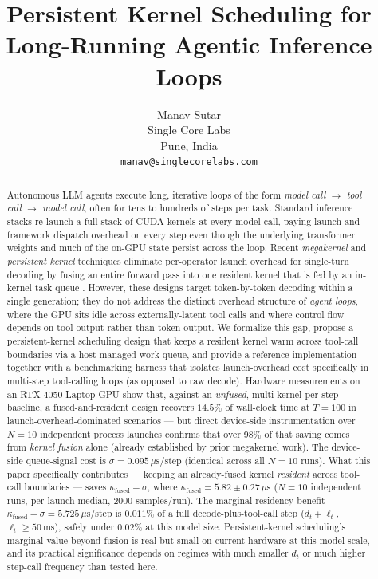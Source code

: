 \documentclass{article}
\title{Persistent Kernel Scheduling for Long-Running Agentic Inference Loops}
\author{
  Manav Sutar \\
  Single Core Labs \\
  Pune, India \\
  \texttt{manav@singlecorelabs.com}
}
\begin{document}
\maketitle

\begin{abstract}
Autonomous LLM agents execute long, iterative loops of the form
\emph{model call} $\rightarrow$ \emph{tool call} $\rightarrow$ \emph{model call},
often for tens to hundreds of steps per task. Standard inference stacks
re-launch a full stack of CUDA kernels at every model call, paying
launch and framework dispatch overhead on every step even though the
underlying transformer weights and much of the on-GPU state persist
across the loop. Recent \emph{megakernel} and \emph{persistent kernel}
techniques eliminate per-operator launch overhead for single-turn
decoding by fusing an entire forward pass into one resident kernel
that is fed by an in-kernel task queue \citep{mpk2025,kog2026,adamk2026}.
However, these designs target token-by-token decoding within a single
generation; they do not address the distinct overhead structure of
\emph{agent loops}, where the GPU sits idle across externally-latent
tool calls and where control flow depends on tool output rather than
token output. We formalize this gap, propose a persistent-kernel
scheduling design that keeps a resident kernel warm across tool-call
boundaries via a host-managed work queue, and provide a reference
implementation together with a benchmarking harness that isolates
launch-overhead cost specifically in multi-step tool-calling loops
(as opposed to raw decode). Hardware measurements on an RTX 4050
Laptop GPU show that, against an \emph{unfused}, multi-kernel-per-step
baseline, a fused-and-resident design recovers $14.5\%$ of
wall-clock time at $T=100$ in launch-overhead-dominated scenarios ---
but direct device-side instrumentation over $N=10$ independent
process launches confirms that over $98\%$ of that saving comes from
\emph{kernel fusion} alone (already established by prior megakernel
work). The device-side queue-signal cost is
$\sigma = 0.095\,\mu\text{s}$/step (identical across all $N=10$
runs). What this paper specifically contributes --- keeping an
already-fused kernel \emph{resident} across tool-call boundaries ---
saves $\kappa_{\text{fused}} - \sigma$, where
$\kappa_{\text{fused}} = 5.82 \pm 0.27\,\mu\text{s}$
($N=10$ independent runs, per-launch median, $2000$ samples/run).
The marginal residency benefit $\kappa_{\text{fused}} - \sigma =
5.725\,\mu\text{s}$/step is $0.011\%$ of a full decode-plus-tool-call
step ($d_t + \ell_t$, $\ell_t \geq 50$\,ms), safely under
$0.02\%$ at this model size. Persistent-kernel scheduling's marginal value beyond fusion is
real but small on current hardware at this model scale, and its
practical significance depends on regimes with much smaller $d_t$
or much higher step-call frequency than tested here.
\end{abstract}
\end{document}
